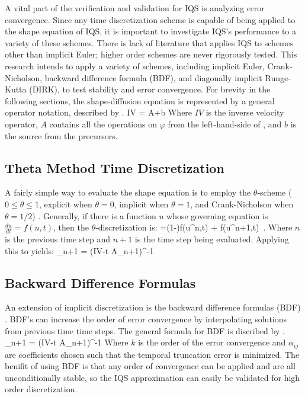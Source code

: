A vital part of the verification and validation for IQS is analyzing error convergence.  Since any time discretization scheme is capable of being applied to the shape equation of IQS, it is important to investigate IQS's performance to a variety of these schemes.  There is lack of literature that applies IQS to schemes other than implicit Euler; higher order schemes are never rigorously tested.  This research intends to apply a variety of schemes, including implicit Euler, Crank-Nicholson, backward difference formula (BDF), and diagonally implicit Runge-Kutta (DIRK), to test stability and error convergence.  For brevity in the following sections, the shape-diffusion equation is represented by a general operator notation, described by .
\be 
IV = A\varphi+b
\label{eq:shape_mat}
\ee
Where $IV$ is the inverse velocity operator, $A$ contains all the operations on $\varphi$ from the left-hand-side of , and $b$ is the source from the precursors. 

\subsection{Theta Method Time Discretization}
\label{sect:theta}

A fairly simple way to evaluate the shape equation is to employ the $\theta$-scheme ($0\le\theta\le1$, explicit when $\theta=0$, implicit when $\theta=1$, and Crank-Nicholson when $\theta=1/2$) \cite{Ferziger}.  Generally, if there is a function $u$ whose governing equation is $\frac{du}{dt}=f(u,t)$, then the $\theta$-discretization is:
\be
{}=(1-\theta)f(u^n,t) + \theta f(u^{n+1},t) \,.
\ee
Where $n$ is the previous time step and $n+1$ is the time step being evaluated. Applying this to  yields:
\be
\varphi_{n+1} = (IV-\Delta t A_{n+1})^{-1}
\ee

\subsection{Backward Difference Formulas}

An extension of implicit discretization is the backward difference formulas (BDF) \cite{Gear:2007}.  BDF's can increase the order of error convergence by interpolating solutions from previous time time steps. The general formula for BDF is discribed by .
\be 
\varphi_{n+1} = (IV-\Delta t A_{n+1})^{-1}\left[IV\sum_{j=0}^{k-1}\alpha_{jk}\varphi_{n-j} +
\Delta t b_{n+1}\right]
\label{eq:bdf}
\ee
Where $k$ is the order of the error convergence and $\alpha_{ij}$ are coefficients chosen such that the temporal truncation error is minimized.  The benifit of using BDF is that any order of convergence can be applied and are all unconditionally stable, so the IQS approximation can easily be validated for high order discretization.

